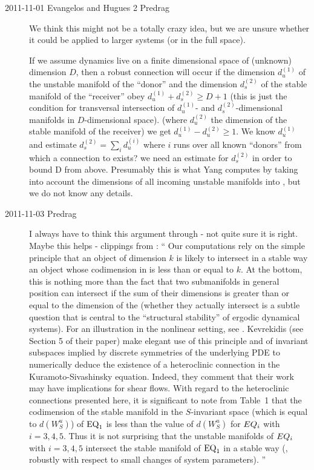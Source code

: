 \begin{description}
\item[2011-11-01 Evangelos and Hugues 2 Predrag] We think this might not be a totally
crazy idea, but we are unsure whether it could be applied to larger systems (or in the
full space).

If we assume dynamics live on a finite dimensional space of (unknown)
dimension $D$, then a robust connection will occur if the dimension
$d_u^{(1)}$ of the unstable manifold of the ``donor''  and the
dimension $d_s^{(2)}$ of the stable manifold of the ``receiver''  
obey $d_u^{(1)}+d_s^{(2)} \geq D+1$ (this is just the condition for
transversal intersection of $d_u^{(1)}$- and $d_s^{(2)}$-dimensional
manifolds in $D$-dimensional space). %
(where $d_u^{(2)}$ the dimension of the stable manifold of the receiver)
we get $d_u^{(1)}-d_u^{(2)}\geq1$. We know $d_u^{(1)}$ and %
estimate $d_s^{(2)}=\sum_i d_u^{(i)}$ where $i$ runs over all known %
``donors'' from which a connection to  exists? we need an estimate
for  $d_s^{(2)}$ in order to bound D from above. Presumably this is what
Yang computes by taking into account the dimensions of all incoming
unstable manifolds into , but we do not know any details.

\item[2011-11-03 Predrag] I always have to think this argument through -
not quite sure it is right. Maybe this helps -
clippings from : ``
Our computations rely on the simple principle that an object of dimension
$k$ is likely to intersect in a stable way an object whose codimension in
{\statesp} is less than or equal to $k$. At the bottom, this is nothing
more than the fact that two submanifolds in general position can
intersect if the sum of their dimensions is greater than or equal to the
dimension of the {\statesp} (whether they actually intersect is a subtle
question that is central to the ``structural stability'' of ergodic
dynamical systems). For an illustration in the nonlinear
setting, see . Kevrekidis \etal{} (see Section 5
of their paper) make elegant use of this principle and of invariant
subspaces implied by discrete symmetries of the underlying PDE to
numerically deduce the existence of a heteroclinic connection in the
Kuramoto-Sivashinsky equation. Indeed, they comment that their work may
have implications for shear flows. With regard to the heteroclinic
connections presented here, it is significant to note from Table~1 that
the codimension of the stable manifold in the $S$-invariant space (which
is equal to $d(W^u_S)$) of ${\text{EQ}_1}$ is less than the value of $d(W^u_S)$
for $EQ_{i}$ with $i=3,4,5$. Thus it is not surprising that the unstable
manifolds of $EQ_{i}$ with $i=3,4,5$ intersect the stable manifold of
{${\text{EQ}_1}$} in a stable way (\ie, robustly with respect to small changes of
system parameters).
''


\end{description}
